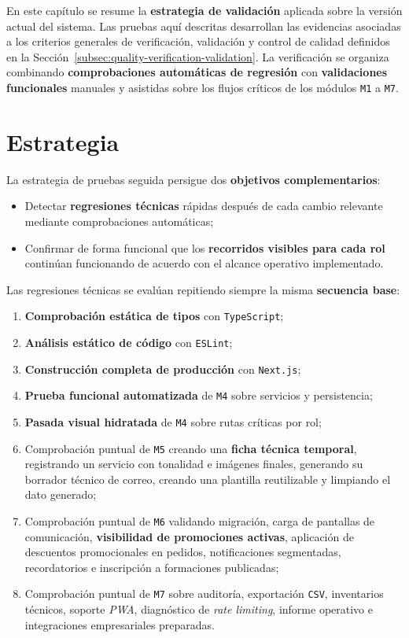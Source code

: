 En este capítulo se resume la \textbf{estrategia de validación} aplicada sobre la versión actual del sistema. Las pruebas aquí descritas desarrollan las evidencias asociadas a los criterios generales de verificación, validación y control de calidad definidos en la Sección~\ref{subsec:quality-verification-validation}. La verificación se organiza combinando \textbf{comprobaciones automáticas de regresión} con \textbf{validaciones funcionales} manuales y asistidas sobre los flujos críticos de los módulos \texttt{M1} a \texttt{M7}.

\section{Estrategia}

La estrategia de pruebas seguida persigue dos \textbf{objetivos complementarios}:

\begin{itemize}
    \item Detectar \textbf{regresiones técnicas} rápidas después de cada cambio relevante mediante comprobaciones automáticas;
    \item Confirmar de forma funcional que los \textbf{recorridos visibles para cada rol} continúan funcionando de acuerdo con el alcance operativo implementado.
\end{itemize}

Las regresiones técnicas se evalúan repitiendo siempre la misma \textbf{secuencia base}:

\begin{enumerate}
    \item \textbf{Comprobación estática de tipos} con \texttt{TypeScript};
    \item \textbf{Análisis estático de código} con \texttt{ESLint};
    \item \textbf{Construcción completa de producción} con \texttt{Next.js};
    \item \textbf{Prueba funcional automatizada} de \texttt{M4} sobre servicios y persistencia;
    \item \textbf{Pasada visual hidratada} de \texttt{M4} sobre rutas críticas por rol;
    \item Comprobación puntual de \texttt{M5} creando una \textbf{ficha técnica temporal}, registrando un servicio con tonalidad e imágenes finales, generando su borrador técnico de correo, creando una plantilla reutilizable y limpiando el dato generado;
    \item Comprobación puntual de \texttt{M6} validando migración, carga de pantallas de comunicación, \textbf{visibilidad de promociones activas}, aplicación de descuentos promocionales en pedidos, notificaciones segmentadas, recordatorios e inscripción a formaciones publicadas;
    \item Comprobación puntual de \texttt{M7} sobre auditoría, exportación \texttt{CSV}, inventarios técnicos, soporte \textit{PWA}, diagnóstico de \textit{rate limiting}, informe operativo e integraciones empresariales preparadas.
\end{enumerate}

